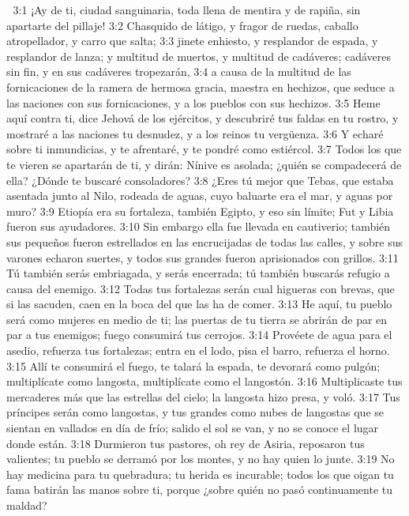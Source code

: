 
3:1 ¡Ay de ti, ciudad sanguinaria, toda llena de mentira y de rapiña, sin apartarte del pillaje!  
3:2 Chasquido de látigo, y fragor de ruedas, caballo atropellador, y carro que salta;  
3:3 jinete enhiesto, y resplandor de espada, y resplandor de lanza; y multitud de muertos, y multitud de cadáveres; cadáveres sin fin, y en sus cadáveres tropezarán,  
3:4 a causa de la multitud de las fornicaciones de la ramera de hermosa gracia, maestra en hechizos, que seduce a las naciones con sus fornicaciones, y a los pueblos con sus hechizos.  
3:5 Heme aquí contra ti, dice Jehová de los ejércitos, y descubriré tus faldas en tu rostro, y mostraré a las naciones tu desnudez, y a los reinos tu vergüenza.  
3:6 Y echaré sobre ti inmundicias, y te afrentaré, y te pondré como estiércol.  
3:7 Todos los que te vieren se apartarán de ti, y dirán: Nínive es asolada; ¿quién se compadecerá de ella? ¿Dónde te buscaré consoladores?  
3:8 ¿Eres tú mejor que Tebas, que estaba asentada junto al Nilo, rodeada de aguas, cuyo baluarte era el mar, y aguas por muro?  
3:9 Etiopía era su fortaleza, también Egipto, y eso sin límite; Fut y Libia fueron sus ayudadores.  
3:10 Sin embargo ella fue llevada en cautiverio; también sus pequeños fueron estrellados en las encrucijadas de todas las calles, y sobre sus varones echaron suertes, y todos sus grandes fueron aprisionados con grillos.  
3:11 Tú también serás embriagada, y serás encerrada; tú también buscarás refugio a causa del enemigo.  
3:12 Todas tus fortalezas serán cual higueras con brevas, que si las sacuden, caen en la boca del que las ha de comer.  
3:13 He aquí, tu pueblo será como mujeres en medio de ti; las puertas de tu tierra se abrirán de par en par a tus enemigos; fuego consumirá tus cerrojos.  
3:14 Provéete de agua para el asedio, refuerza tus fortalezas; entra en el lodo, pisa el barro, refuerza el horno.  
3:15 Allí te consumirá el fuego, te talará la espada, te devorará como pulgón; multiplícate como langosta, multiplícate como el langostón.  
3:16 Multiplicaste tus mercaderes más que las estrellas del cielo; la langosta hizo presa, y voló.  
3:17 Tus príncipes serán como langostas, y tus grandes como nubes de langostas que se sientan en vallados en día de frío; salido el sol se van, y no se conoce el lugar donde están.  
3:18 Durmieron tus pastores, oh rey de Asiria, reposaron tus valientes; tu pueblo se derramó por los montes, y no hay quien lo junte.  
3:19 No hay medicina para tu quebradura; tu herida es incurable; todos los que oigan tu fama batirán las manos sobre ti, porque ¿sobre quién no pasó continuamente tu maldad?

